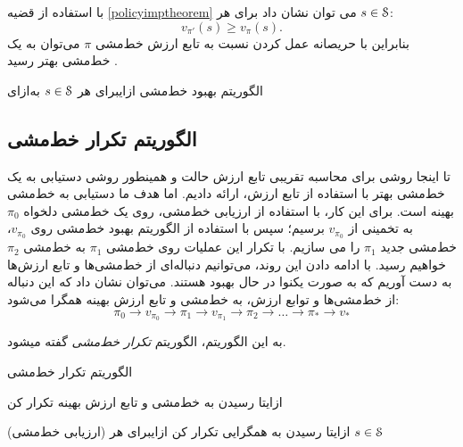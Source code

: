 با استفاده از قضیه \ref{policyimptheorem} می توان نشان داد برای هر
$s \in \EuScript{S}$:
$$v_{\pi'}(s) \ge v_{\pi}(s).$$
بنابراین با حریصانه عمل کردن نسبت به تابع ارزش خط‌مشی $\pi$ می‌توان به یک خط‌مشی بهتر رسید \cite{suttonbook}.


{الگوریتم بهبود خط‌مشی \cite{suttonbook}}
‌ازای{برای هر $s \in \EuScript{S}$}
‌به‌ازای

\subsection{الگوریتم تکرار خط‌مشی}
تا اینجا روشی برای محاسبه تقریبی تابع ارزش حالت و همینطور روشی دستیابی به یک خط‌مشی بهتر با استفاده از تابع ارزش، ارائه دادیم. اما هدف ما دستیابی به خط‌مشی بهینه است. 
برای این کار، با استفاده از ارزیابی خط‌مشی، روی یک خط‌مشی دلخواه $\pi_0$ به تخمینی از 
$v_{\pi_0}$
 برسیم؛ سپس با استفاده از الگوریتم بهبود خط‌مشی روی 
$v_{\pi_0}$،
خط‌مشی جدید 
$\pi_1$
را می سازیم. با تکرار این عملیات روی خط‌مشی 
$\pi_1$
به خط‌مشی 
$\pi_2$
خواهیم رسید. با ادامه دادن این روند، می‌توانیم دنباله‌ای از خط‌مشی‌ها و تابع ارزش‌ها به دست آوریم که به صورت یکنوا در حال بهبود هستند. می‌توان نشان داد که این دنباله از خط‌مشی‌ها و توابع ارزش، به خط‌مشی و تابع ارزش بهینه همگرا می‌شود:
$$\pi_0 \longrightarrow v_{\pi_0} \longrightarrow \pi_1 \longrightarrow v_{\pi_1} \longrightarrow \pi_2 \longrightarrow \dots \longrightarrow \pi_* \longrightarrow v_*$$

به این الگوریتم، الگوریتم \textit{تکرار خط‌مشی}  
گفته می\nf شود.

{الگوریتم تکرار خط‌مشی \cite{suttonbook}}

‌ازای{تا رسیدن به خط‌مشی و تابع ارزش بهینه تکرار کن}

(ارزیابی خط‌مشی)
‌ازای{تا رسیدن به همگرایی تکرار کن}
‌ازای{برای هر $s \in \EuScript{S}$}

